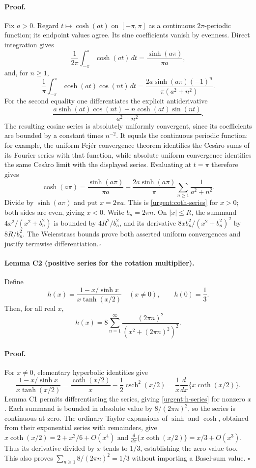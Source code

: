 \paragraph{Proof.}
Fix $a>0$. Regard $t\mapsto\cosh(at)$ on $[-\pi,\pi]$ as a
continuous $2\pi$-periodic function; its endpoint values agree.
Its sine coefficients vanish by evenness. Direct integration gives
\[
 \frac1{2\pi}\int_{-\pi}^{\pi}\cosh(at)\,dt
       =\frac{\sinh(a\pi)}{\pi a},
\]
and, for $n\geq1$,
\[
 \frac1\pi\int_{-\pi}^{\pi}\cosh(at)\cos(nt)\,dt
       =\frac{2a\sinh(a\pi)(-1)^n}{\pi(a^2+n^2)}.
\]
For the second equality one differentiates the explicit antiderivative
\[
 \frac{a\sinh(at)\cos(nt)+n\cosh(at)\sin(nt)}{a^2+n^2}.
\]
The resulting cosine series is absolutely uniformly convergent, since
its coefficients are bounded by a constant times $n^{-2}$.
It equals the continuous periodic function: for example, the uniform
Fej\'er convergence theorem identifies the Ces\`aro sums of its Fourier
series with that function, while absolute uniform convergence identifies
the same Ces\`aro limit with the displayed series.
Evaluating at $t=\pi$ therefore gives
\[
 \cosh(a\pi)=\frac{\sinh(a\pi)}{\pi a}
       +\frac{2a\sinh(a\pi)}\pi\sum_{n\geq1}\frac1{a^2+n^2}.
\]
Divide by $\sinh(a\pi)$ and put $x=2\pi a$. This is
\eqref{urgent:coth-series} for $x>0$; both sides are even, giving $x<0$.
Write $b_n=2\pi n$. On $|x|\leq R$, the summand
$4x^2/(x^2+b_n^2)$ is bounded by $4R^2/b_n^2$, and its derivative
$8xb_n^2/(x^2+b_n^2)^2$ by $8R/b_n^2$.
The Weierstrass bounds prove both asserted uniform convergences and
justify termwise differentiation.\hfill$\square$

\paragraph{Lemma C2 (positive series for the rotation multiplier).}
Define
\[
 h(x)=\frac{1-x/\sinh x}{x\tanh(x/2)}\quad(x\ne0),
 \qquad h(0)=\frac13.
\]
Then, for all real $x$,
\begin{equation}
 h(x)=8\sum_{n=1}^\infty
                    \frac{(2\pi n)^2}{(x^2+(2\pi n)^2)^2}.
 \label{urgent:h-series}
\end{equation}

\paragraph{Proof.}
For $x\ne0$, elementary hyperbolic identities give
\[
 \frac{1-x/\sinh x}{x\tanh(x/2)}
 =\frac{\coth(x/2)}x-\frac12\operatorname{csch}^2(x/2)
 =\frac1x\frac d{dx}\{x\coth(x/2)\}.
\]
Lemma C1 permits differentiating the series, giving
\eqref{urgent:h-series} for nonzero $x$. Each summand is bounded
in absolute value by $8/(2\pi n)^2$, so the series is continuous at zero.
The ordinary Taylor expansions of $\sinh$ and $\cosh$, obtained from
their exponential series with remainders, give
$x\coth(x/2)=2+x^2/6+O(x^4)$ and
$\frac d{dx}\{x\coth(x/2)\}=x/3+O(x^3)$.
Thus its derivative divided by $x$ tends to $1/3$, establishing the
zero value too. This also proves
$\sum_{n\geq1}8/(2\pi n)^2=1/3$ without importing a Basel-sum value.
\hfill$\square$

